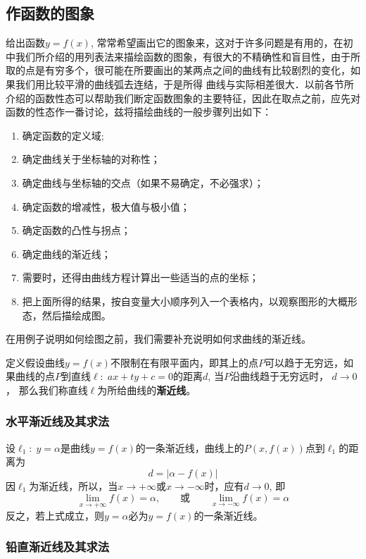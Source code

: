 \subsection{作函数的图象}
给出函数$y=f(x)$, 常常希望画出它的图象来，这对于许多问题是有用的，在初中我们所介绍的用列表法来描绘函数的图象，有很大的不精确性和盲目性，由于所取的点是有穷多个，很可能在所要画出的某两点之间的曲线有比较剧烈的变化，如果我们用比较平滑的曲线弧去连结，于是所得
曲线与实际相差很大．以前各节所介绍的函数性态可以帮助我们断定函数图象的主要特征，因此在取点之前，应先对函数的性态作一番讨论，兹将描绘曲线的一般步骤列出如下：

\begin{enumerate}
\item 确定函数的定义域;
\item 确定曲线关于坐标轴的对称性；
\item 确定曲线与坐标轴的交点（如果不易确定，不必强求）；
\item 确定函数的增减性，极大值与极小值；
\item 确定函数的凸性与拐点；
\item 确定曲线的渐近线；
\item 需要时，还得由曲线方程计算出一些适当的点的坐标；
\item 把上面所得的结果，按自变量大小顺序列入一个表格内，以观察图形的大概形态，然后描绘成图。
\end{enumerate}

在用例子说明如何绘图之前，我们需要补充说明如何求曲线的渐近线。

\begin{blk}
    {定义}假设曲线$y=f(x)$不限制在有限平面内，即其上的点$P$可以趋于无穷远，如果曲线的点$P$到直线$\ell:\; ax+ty+c=0$的距离$d$, 当$P$沿曲线趋于无穷远时，
    $d\to 0$，
    那么我们称直线$\ell$为所给曲线的\textbf{渐近线}。
\end{blk}

\subsubsection{水平渐近线及其求法}

设$\ell_1:\; y=\alpha$是曲线$y=f(x)$的一条渐近线，曲线上的$P(x,f(x))$点到$\ell_1$的距离为
\[d=|\alpha-f(x)|\]
因$\ell_1$为渐近线，所以，当$x\to +\infty$或$x\to -\infty$时，应有$d\to 0$, 即
\[\lim_{x\to+\infty}f(x)=\alpha,\qquad \text{或}\qquad \lim_{x\to -\infty}f(x)=\alpha\]
反之，若上式成立，则$y=\alpha$必为$y=f(x)$的一条渐近线。

\subsubsection{铅直渐近线及其求法}

